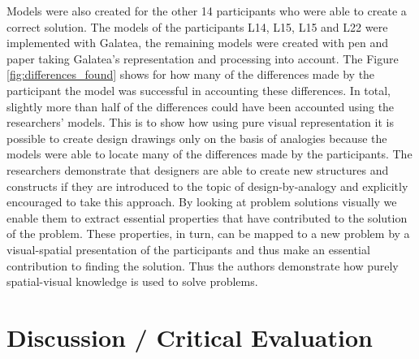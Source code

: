 \documentclass[12pt]{article}
\begin{document}
Models were also created for the other 14 participants who were able to create a correct solution. The models of the participants L14, L15, L15 and L22 were implemented with Galatea, the remaining models were created with pen and paper taking Galatea's representation and processing into account. The Figure \ref{fig:differences_found} shows for how many of the differences made by the participant the model was successful in accounting these differences. In total, slightly more than half of the differences could have been accounted using the researchers' models. This is to show how using pure visual representation it is possible to create design drawings only on the basis of analogies because the models were able to locate many of the differences made by the participants. The researchers demonstrate that designers are able to create new structures and constructs if they are introduced to the topic of design-by-analogy and explicitly encouraged to take this approach. By looking at problem solutions visually we enable them to extract essential properties that have contributed to the solution of the problem. These properties, in turn, can be mapped to a new problem by a visual-spatial presentation of the participants and thus make an essential contribution to finding the solution. Thus the authors demonstrate how purely spatial-visual knowledge is used to solve problems. 



\section{Discussion / Critical Evaluation}
\end{document}
